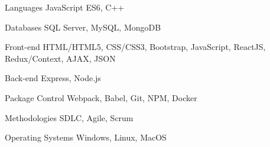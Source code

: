 

\begin{cvskills}

  \cvskill
    {Languages} %
    {JavaScript ES6, C++} %

  \cvskill
    {Databases} %
    {SQL Server, MySQL, MongoDB} %

  \cvskill
    {Front-end} %
    {HTML/HTML5, CSS/CSS3, Bootstrap, JavaScript, ReactJS, Redux/Context, AJAX, JSON} %

  \cvskill
    {Back-end} %
    {Express, Node.js} %

  \cvskill
    {Package Control} %
    {Webpack, Babel, Git, NPM, Docker} %

\cvskill
{Methodologies} %
{SDLC, Agile, Scrum} %

\cvskill
{Operating Systems} %
{Windows, Linux, MacOS} %

\end{cvskills}
